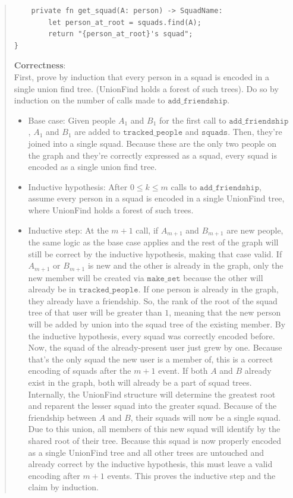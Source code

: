 \documentclass[11pt]{article}
\newcommand{\code}[1]{$\texttt{#1}$}
\begin{document}
\begin{enumerate}
\begin{enumerate}
\begin{quote}
\begin{verbatim}
    private fn get_squad(A: person) -> SquadName:
        let person_at_root = squads.find(A);
        return "{person_at_root}'s squad";
}
\end{verbatim}

\medskip 
\textbf{Correctness}: \\ 
First, prove by induction that every person in a squad is encoded in a single union find tree. (UnionFind holds a forest of such trees). Do so by induction on the number of calls made to \code{add\_friendship}. 

\begin{itemize}
  \item Base case: Given people $A_1$ and $B_1$ for the first call to \code{add\_friendship}, $A_1$ and $B_1$ are added to \code{tracked\_people} and \code{squads}. Then, they're joined into a single squad. Because these are the only two people on the graph and they're correctly expressed as a squad, every squad is encoded as a single union find tree. 
  \item Inductive hypothesis: After $0 \leq k \leq m$ calls to \code{add\_friendship}, assume every person in a squad is encoded in a single UnionFind tree, where UnionFind holds a forest of such trees. 
  \item Inductive step: At the $m + 1$ call, if $A_{m + 1}$ and $B_{m + 1}$ are new people, the same logic as the base case applies and the rest of the graph will still be correct by the inductive hypothesis, making that case valid. If $A_{m + 1}$ or $B_{m + 1}$ is new and the other is already in the graph, only the new member will be created via \code{make\_set} because the other will already be in \code{tracked\_people}. If one person is already in the graph, they already have a friendship. So, the rank of the root of the squad tree of that user will be greater than $1$, meaning that the new person will be added by union into the squad tree of the existing member. By the inductive hypothesis, every squad was correctly encoded before. Now, the squad of the already-present user just grew by one. Because that's the only squad the new user is a member of, this is a correct encoding of squads after the $m + 1$ event. If both $A$ and $B$ already exist in the graph, both will already be a part of squad trees. Internally,  the UnionFind structure will determine the greatest root and reparent the lesser squad into the greater squad. Because of the friendship between $A$ and $B$, their squads will now be a single squad. Due to this union, all members of this new squad will identify by the shared root of their tree. Because this squad is now properly encoded as a single UnionFind tree and all other trees are untouched and already correct by the inductive hypothesis, this must leave a valid encoding after $m + 1$ events. This proves the inductive step and the claim by induction.
\end{itemize}


\end{quote}
\end{enumerate}
\end{enumerate}
\end{document}
